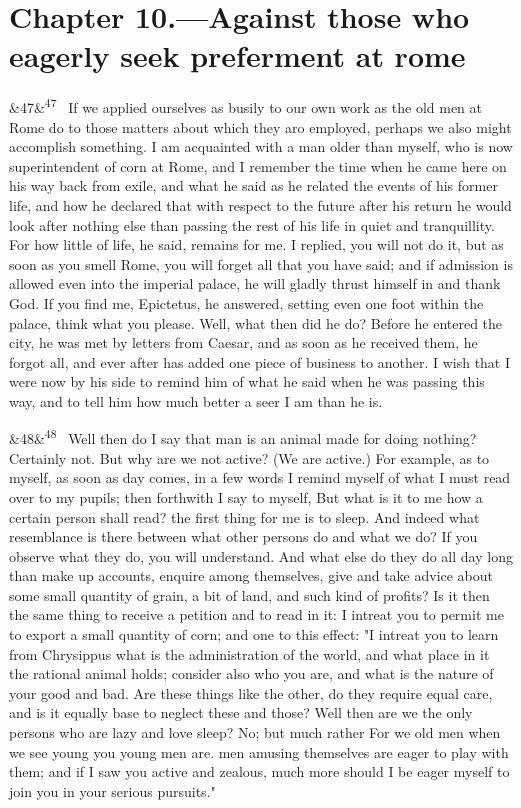 \documentclass[12pt]{article}
\newcommand{\para}[1][]{\par\noindent\ifx&#1&\else\textsuperscript{\footnotesize #1}~\fi}
\begin{document}
\section*{Chapter 10.---Against those who eagerly seek preferment at rome}

\para[47] If we applied ourselves as busily to our own work as the old men at Rome do to those matters about which they aro employed, perhaps we also might accomplish something. I am acquainted with a man older than myself, who is now superintendent of corn at Rome, and I remember the time when he came here on his way back from exile, and what he said as he related the events of his former life, and how he declared that with respect to the future after his return he would look after nothing else than passing the rest of his life in quiet and tranquillity. For how little of life, he said, remains for me. I replied, you will not do it, but as soon as you smell Rome, you will forget all that you have said; and if admission is allowed even into the imperial palace, he will gladly thrust himself in and thank God. If you find me, Epictetus, he answered, setting even one foot within the palace, think what you please. Well, what then did he do? Before he entered the city, he was met by letters from Caesar, and as soon as he received them, he forgot all, and ever after has added one piece of business to another. I wish that I were now by his side to remind him of what he said when he was passing this way, and to tell him how much better a seer I am than he is.

\para[48] Well then do I say that man is an animal made for doing nothing? Certainly not. But why are we not active? (We are active.) For example, as to myself, as soon as day comes, in a few words I remind myself of what I must read over to my pupils; then forthwith I say to myself, But what is it to me how a certain person shall read? the first thing for me is to sleep. And indeed what resemblance is there between what other persons do and what we do? If you observe what they do, you will understand. And what else do they do all day long than make up accounts, enquire among themselves, give and take advice about some small quantity of grain, a bit of land, and such kind of profits? Is it then the same thing to receive a petition and to read in it: I intreat you to permit me to export a small quantity of corn; and one to this effect: "I intreat you to learn from Chrysippus what is the administration of the world, and what place in it the rational animal holds; consider also who you are, and what is the nature of your good and bad. Are these things like the other, do they require equal care, and is it equally base to neglect these and those? Well then are we the only persons who are lazy and love sleep? No; but much rather For we old men when we see young you young men are. men amusing themselves are eager to play with them; and if I saw you active and zealous, much more should I be eager myself to join you in your serious pursuits."
\end{document}

